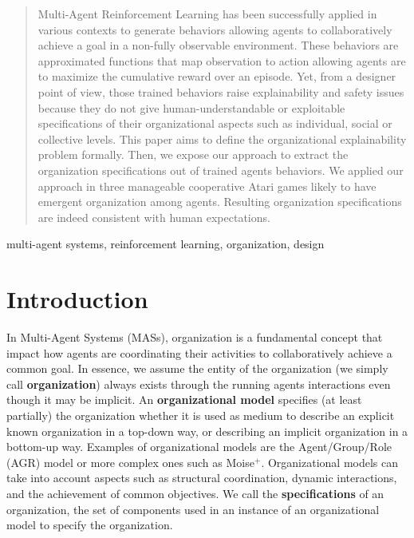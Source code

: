 \documentclass[conference]{IEEEtran}
\begin{document}
\maketitle


\begin{abstract}

    Multi-Agent Reinforcement Learning has been successfully applied in various contexts to generate behaviors allowing agents to collaboratively achieve a goal in a non-fully observable environment. These behaviors are approximated functions that map observation to action allowing agents are to maximize the cumulative reward over an episode.
    Yet, from a designer point of view, those trained behaviors raise explainability and safety issues because they do not give human-understandable or exploitable specifications of their organizational aspects such as individual, social or collective levels.
    This paper aims to define the organizational explainability problem formally. Then, we expose our approach to extract the organization specifications out of trained agents behaviors.
    We applied our approach in three manageable cooperative Atari games likely to have emergent organization among agents. Resulting organization specifications are indeed consistent with human expectations.

\end{abstract}

\begin{IEEEkeywords}
    multi-agent systems, reinforcement learning, organization, design
\end{IEEEkeywords}

\section{Introduction}

In Multi-Agent Systems (MASs), organization is a fundamental concept that impact how agents are coordinating their activities to collaboratively achieve a common goal\cite{Hubner2002}. In essence, we assume the entity of the organization (we simply call \textbf{organization}) always exists through the running agents interactions even though it may be implicit.
An \textbf{organizational model} specifies (at least partially) the organization whether it is used as medium to describe an explicit known organization in a top-down way, or describing an implicit organization in a bottom-up way. Examples of organizational models are the Agent/Group/Role (AGR) model\cite{Ferber2004} or more complex ones such as Moise$^+$\cite{Hubner2002}. Organizational models can take into account aspects such as structural coordination, dynamic interactions, and the achievement of common objectives\cite{Ferber2004, Abbas2015}. We call the \textbf{specifications} of an organization, the set of components used in an instance of an organizational model to specify the organization.
\end{document}
